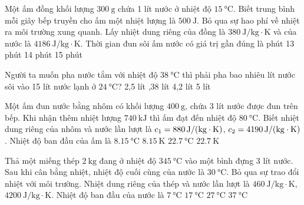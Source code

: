 \begin{ex}
	Một ấm đồng khối lượng $\SI{300}{\gram}$ chứa 1 lít nước ở nhiệt độ $\SI{15}{\celsius}$. Biết trung bình mỗi giây bếp truyền cho ấm một nhiệt lượng là $\SI{500}{\joule}$. Bỏ qua sự hao phí về nhiệt ra môi trường xung quanh. Lấy nhiệt dung riêng của đồng là $\SI{380}{\joule/\kilogram\cdot\kelvin}$ và của nước là $\SI{4186}{\joule/\kilogram\cdot\kelvin}$. Thời gian đun sôi ấm nước có giá trị gần đúng là
	\choice
	{ phút}
	{13 phút}
	{14 phút}
	{15 phút}
\end{ex}
\begin{ex}
	Người ta muốn pha nước tắm với nhiệt độ $\SI{38}{\celsius}$ thì phải pha bao nhiêu lít nước sôi vào 15 lít nước lạnh ở $\SI{24}{\celsius}$?
	\choice
	{2,5 lít}
	{,38 lít}
	{4,2 lít}
	{5 lít}
\end{ex}
\begin{ex}
	Một ấm đun nước bằng nhôm có khối lượng $\SI{400}{\gram}$, chứa 3 lít nước được đun trên bếp. Khi nhận thêm nhiệt lượng $\SI{740}{\kilo\joule}$ thì ấm đạt đến nhiệt độ $\SI{80}{\celsius}$. Biết nhiệt dung riêng của nhôm và nước lần lượt là $c_1=\SI{880}{\joule/\left(\kilogram\cdot\kelvin\right)}$, $c_2=\SI{4190}{\joule/\left(\kilogram\cdot\kelvin\right)}$. Nhiệt độ ban đầu của ấm là
	\choice
	{$\SI{8.15}{\celsius}$}
	{$\SI{8.15}{\kelvin}$}
	{\True $\SI{22.7}{\celsius}$}
	{$\SI{22.7}{\kelvin}$}
\end{ex}
\begin{ex}
Thả một miếng thép $\SI{2}{\kilogram}$ đang ở nhiệt độ $\SI{345}{\celsius}$ vào một bình đựng 3 lít nước. Sau khi cân bằng nhiệt, nhiệt độ cuối cùng của nước là $\SI{30}{\celsius}$. Bỏ qua sự trao đổi nhiệt với môi trường. Nhiệt dung riêng của thép và nước lần lượt là $\SI{460}{\joule/\kilogram\cdot\kelvin}$, $\SI{4200}{\joule/\kilogram\cdot\kelvin}$. Nhiệt độ ban đầu của nước là
	\choice
	{\True $\SI{7}{\celsius}$}
	{$\SI{17}{\celsius}$}
	{$\SI{27}{\celsius}$}
	{$\SI{37}{\celsius}$}
\end{ex}
